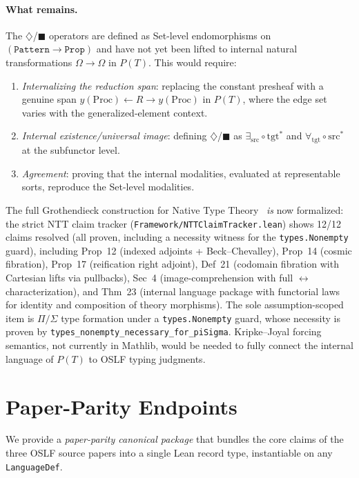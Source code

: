 \documentclass[]{article}
\newcommand{\code}[1]{\texttt{#1}}
\newcommand{\Dia}{\ensuremath{\diamondsuit}}
\newcommand{\Bx}{\ensuremath{\blacksquare}}
\newcommand{\OSLF}{\textup{OSLF}}
\begin{document}
\paragraph{What remains.}
The $\Dia$/$\Bx$ operators are defined as Set-level endomorphisms on
$(\mathtt{Pattern} \to \mathtt{Prop})$ and have not yet been lifted to
internal natural transformations $\Omega \to \Omega$ in $P(T)$.  This would
require:
\begin{enumerate}
\item \emph{Internalizing the reduction span}: replacing the constant presheaf
  with a genuine span $y(\mathrm{Proc}) \leftarrow R \to y(\mathrm{Proc})$
  in $P(T)$, where the edge set varies with the generalized-element context.
\item \emph{Internal existence/universal image}: defining $\Dia$/$\Bx$ as
  $\exists_{\mathrm{src}} \circ \mathrm{tgt}^*$ and
  $\forall_{\mathrm{tgt}} \circ \mathrm{src}^*$ at the subfunctor level.
\item \emph{Agreement}: proving that the internal modalities, evaluated at
  representable sorts, reproduce the Set-level modalities.
\end{enumerate}
The full Grothendieck construction for Native Type Theory~\cite{WilliamsStay2021}
\emph{is} now formalized: the strict NTT claim tracker
(\code{Framework/NTTClaimTracker.lean}) shows 12/12 claims resolved
(all proven, including a necessity witness for the \code{types.Nonempty} guard), including
Prop~12 (indexed adjoints + Beck--Chevalley), Prop~14 (cosmic fibration),
Prop~17 (reification right adjoint), Def~21 (codomain fibration with
Cartesian lifts via pullbacks), Sec~4 (image-comprehension with full
$\leftrightarrow$ characterization), and Thm~23 (internal language package
with functorial laws for identity and composition of theory morphisms).
The sole assumption-scoped item is $\Pi/\Sigma$ type formation under
a \code{types.Nonempty} guard, whose necessity is proven by
\code{types\_nonempty\_necessary\_for\_piSigma}.
Kripke--Joyal forcing semantics, not currently in Mathlib, would be needed
to fully connect the internal language of $P(T)$ to \OSLF{} typing judgments.

\section{Paper-Parity Endpoints}
\label{sec:paper-parity}

We provide a \emph{paper-parity canonical package} that bundles the core claims
of the three OSLF source papers into a single Lean record type, instantiable on
any \code{LanguageDef}.
\end{document}
